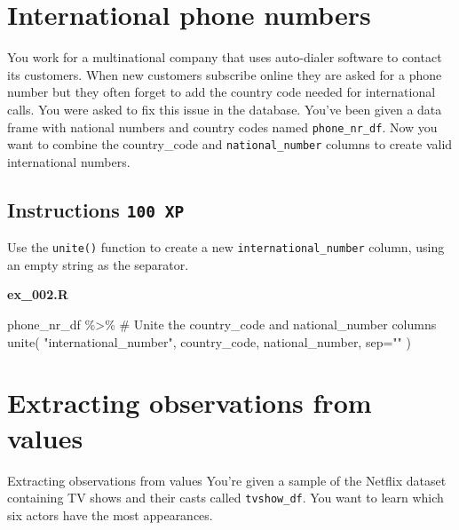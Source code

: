 \documentclass[
  letterpaper,
  DIV=11,
  numbers=noendperiod]{scrreprt}
\newenvironment{Shaded}{\begin{snugshade}}{\end{snugshade}}
\newcommand{\AttributeTok}[1]{\textcolor[rgb]{0.40,0.45,0.13}{#1}}
\newcommand{\CommentTok}[1]{\textcolor[rgb]{0.37,0.37,0.37}{#1}}
\newcommand{\FunctionTok}[1]{\textcolor[rgb]{0.28,0.35,0.67}{#1}}
\newcommand{\NormalTok}[1]{\textcolor[rgb]{0.00,0.23,0.31}{#1}}
\newcommand{\SpecialCharTok}[1]{\textcolor[rgb]{0.37,0.37,0.37}{#1}}
\newcommand{\StringTok}[1]{\textcolor[rgb]{0.13,0.47,0.30}{#1}}
\begin{document}
\hypertarget{international-phone-numbers}{%
\section{International phone
numbers}\label{international-phone-numbers}}

You work for a multinational company that uses auto-dialer software to
contact its customers. When new customers subscribe online they are
asked for a phone number but they often forget to add the country code
needed for international calls. You were asked to fix this issue in the
database. You've been given a data frame with national numbers and
country codes named \texttt{phone\_nr\_df}. Now you want to combine the
country\_code and \texttt{national\_number} columns to create valid
international numbers.

\hypertarget{instructions-100-xp-1}{%
\subsection*{\texorpdfstring{Instructions
\texttt{100\ XP}}{Instructions 100 XP}}\label{instructions-100-xp-1}}

Use the \texttt{unite()} function to create a new
\texttt{international\_number} column, using an empty string as the
separator.

\textbf{ex\_002.R}

\begin{Shaded}
\begin{Highlighting}[]
\NormalTok{phone\_nr\_df }\SpecialCharTok{\%\textgreater{}\%}
  \CommentTok{\# Unite the country\_code and national\_number columns}
  \FunctionTok{unite}\NormalTok{(}
    \StringTok{"international\_number"}\NormalTok{,}
\NormalTok{    country\_code,}
\NormalTok{    national\_number,}
    \AttributeTok{sep=}\StringTok{""}
\NormalTok{  )}
\end{Highlighting}
\end{Shaded}

\hypertarget{extracting-observations-from-values}{%
\section{Extracting observations from
values}\label{extracting-observations-from-values}}

Extracting observations from values You're given a sample of the Netflix
dataset containing TV shows and their casts called \texttt{tvshow\_df}.
You want to learn which six actors have the most appearances.
\end{document}
